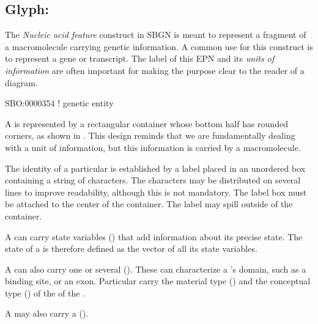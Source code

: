 
\subsection{Glyph: }
\label{sec:genetic}

The \emph{Nucleic acid feature} construct in SBGN is meant to represent a fragment of a macromolecule carrying genetic information.  A common use for this construct is to represent a gene or transcript.  The label of this EPN and its \emph{units of information} are often important for making the purpose clear to the reader of a diagram.

\begin{glyphDescription}

\glyphSboTerm SBO:0000354 ! genetic entity

\glyphContainer A  is represented by a rectangular container whose bottom half has rounded corners, as shown in . This design reminds that we are fundamentally dealing with a unit of information, but this information is carried by a macromolecule.

\glyphLabel The identity of a particular  is established by a label placed in an unordered box containing a string of characters.  The characters may be distributed on several lines to improve readability, although this is not mandatory.  The label box must be attached to the center of the container.  The label may spill outside of the container.

\glyphAux A  can carry state variables () that add information about its precise state.  The state of a  is therefore defined as the vector of all its state variables. 

A  can also carry one or several  ().  These can characterize a 's domain, such as a binding site, or an exon.  Particular  carry the material type () and the conceptual type () of the of the . 

A  may also carry a 
().

\end{glyphDescription}


